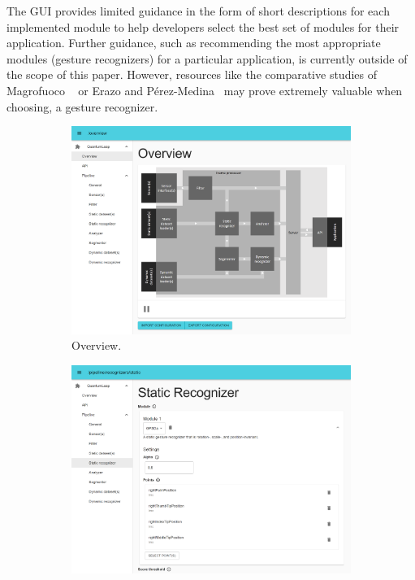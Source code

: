 The GUI provides limited guidance in the form of short descriptions for each implemented module to help developers select the best set of modules for their application. Further guidance, such as recommending the most appropriate modules (\eg gesture recognizers) for a particular application, is currently outside of the scope of this paper. 
However, resources like the comparative studies of Magrofuoco \etal~\cite{Magrofuoco:2021} or Erazo and Pérez-Medina~\cite{Erazo:2020} may prove extremely valuable when choosing, \eg a gesture recognizer. 

\begin{figure}[ht]
    \centering
    \begin{subfigure}{.49\textwidth}
        \centering
        \includegraphics[width=\linewidth]{Figures/QuantumLeap/UI/overview.pdf}  
        \vspace{-15pt}
        \captionsetup{width=.9\linewidth}
        \caption{Overview.}
        \label{fig:quantumleap:ui:1}
    \end{subfigure}
    \begin{subfigure}{.49\textwidth}
        \centering
        \includegraphics[width=\linewidth]{Figures/QuantumLeap/UI/module-static_recognizer.pdf}  

\end{subfigure}
\end{figure}
